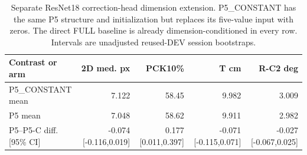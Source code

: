 \begin{table}[t]\centering\footnotesize
\caption{Separate ResNet18 correction-head dimension extension. P5\_CONSTANT has the same P5 structure and initialization but replaces its five-value input with zeros. The direct FULL baseline is already dimension-conditioned in every row. Intervals are unadjusted reused-DEV session bootstraps.}\label{tab:resnetdimhead}
\begin{tabular}{lrrrr}\toprule
Contrast or arm & 2D med. px & PCK10\% & T cm & R-C2 deg\\\midrule
P5\_CONSTANT mean & 7.122 & 58.45 & 9.982 & 3.009\\
P5 mean & 7.048 & 58.62 & 9.911 & 2.982\\\midrule
P5--P5-C diff. [95\% CI] & -0.074 [-0.116,0.019] & 0.177 [0.011,0.397] & -0.071 [-0.115,0.071] & -0.027 [-0.067,0.025]\\
\bottomrule\end{tabular}
\end{table}
